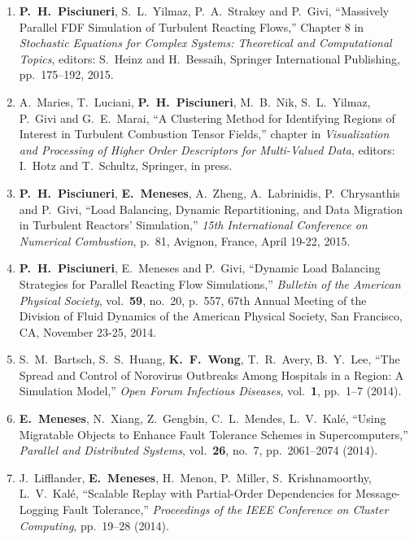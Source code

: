 \begin{enumerate}

\item \textbf{P.\ H.\ Pisciuneri}, S.\ L.\ Yilmaz, P.\ A.\ Strakey and
  P.\ Givi, ``Massively Parallel FDF Simulation of Turbulent Reacting Flows,''
  Chapter 8 in \textit{Stochastic Equations for Complex Systems: Theoretical
    and Computational Topics}, editors: S.\ Heinz and H.\ Bessaih, Springer
  International Publishing, pp.\ 175--192, 2015.
\item A.\ Maries, T.\ Luciani, \textbf{P.\ H.\ Pisciuneri}, M.\ B.\ Nik,
  S.\ L.\ Yilmaz, P.\ Givi and G.\ E.\ Marai, ``A Clustering Method for
  Identifying Regions of Interest in Turbulent Combustion Tensor Fields,''
  chapter in \textit{Visualization and Processing of Higher Order Descriptors
    for Multi-Valued Data}, editors: I.\ Hotz and T.\ Schultz, Springer, in
  press.
\item \textbf{P.\ H.\ Pisciuneri}, \textbf{E.\ Meneses}, A.\ Zheng,
  A.\ Labrinidis, P.\ Chrysanthis and P.\ Givi, ``Load Balancing, Dynamic
  Repartitioning, and Data Migration in Turbulent Reactors' Simulation,''
  \textit{15th International Conference on Numerical Combustion}, p.\ 81,
  Avignon, France, April 19-22, 2015.
\item \textbf{P.\ H.\ Pisciuneri}, E.\ Meneses and P.\ Givi, ``Dynamic Load
  Balancing Strategies for Parallel Reacting Flow Simulations,''
  \textit{Bulletin of the American Physical Society}, vol.\ \textbf{59},
  no.\ 20, p.\ 557, 67th Annual Meeting of the Division of Fluid Dynamics of
  the American Physical Society, San Francisco, CA, November 23-25, 2014.

\item S.\ M.\ Bartsch, S.\ S.\ Huang, \textbf{K.\ F.\ Wong}, T.\ R.\ Avery, B.\ Y.\ Lee, ``The Spread and Control of Norovirus Outbreaks Among Hospitals in a Region: A Simulation Model,'' \textit{Open Forum Infectious Diseases}, vol.\ \textbf{1}, pp.\ 1--7 (2014).

\item \textbf{E.\ Meneses}, N.\ Xiang, Z.\ Gengbin, C.\ L.\ Mendes, L.\ V.\ Kal\'{e}, ``Using Migratable Objects to Enhance Fault Tolerance Schemes in Supercomputers,'' \textit{Parallel and Distributed Systems},
  vol.\ \textbf{26}, no.\ 7, pp.\ 2061--2074 (2014).

\item J.\ Lifflander, \textbf{E.\ Meneses}, H.\ Menon, P.\ Miller,
  S.\ Krishnamoorthy, L.\ V.\ Kal\'{e}, ``Scalable Replay with Partial-Order Dependencies for Message-Logging Fault Tolerance,'' \textit{Proceedings of the IEEE Conference on Cluster Computing}, pp.\ 19--28 (2014).

\end{enumerate}
